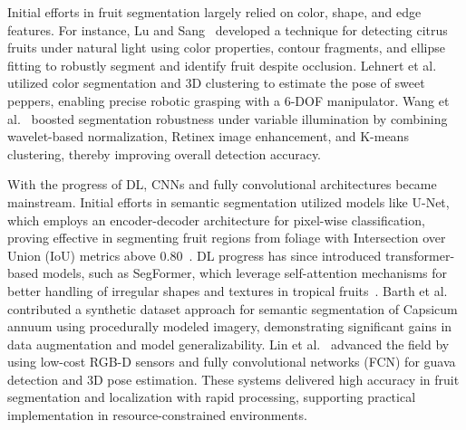 \documentclass[pdflatex,sn-mathphys-num]{sn-jnl}
\begin{document}
Initial efforts in fruit segmentation largely relied on color, shape, and edge features.
For instance, Lu and Sang~\cite{lu2015detecting} developed a technique for detecting citrus fruits under natural light using color properties, contour fragments, and ellipse fitting to robustly segment and identify fruit despite occlusion. 
Lehnert et al.~\cite{lehnert2016sweet} utilized color segmentation and 3D clustering to estimate the pose of sweet peppers, enabling precise robotic grasping with a 6-DOF manipulator. 
Wang et al.~\cite{wang2017robust} boosted segmentation robustness under variable illumination by combining wavelet-based normalization, Retinex image enhancement, and K-means clustering, thereby improving overall detection accuracy.

With the progress of DL, CNNs and fully convolutional architectures became mainstream. Initial efforts in semantic segmentation utilized models like U-Net, which employs an encoder-decoder architecture for pixel-wise classification, proving effective in segmenting fruit regions from foliage with Intersection over Union (IoU) metrics above 0.80~\cite{ronneberger2015u}. DL progress has since introduced transformer-based models, such as SegFormer, which leverage self-attention mechanisms for better handling of irregular shapes and textures in tropical fruits~\cite{xie2021segformer}. 
Barth et al.~\cite{barth2018data} contributed a synthetic dataset approach for semantic segmentation of Capsicum annuum using procedurally modeled imagery, demonstrating significant gains in data augmentation and model generalizability.
Lin et al.~\cite{lin2020color} advanced the field by using low-cost RGB-D sensors and fully convolutional networks (FCN) for guava detection and 3D pose estimation. These systems delivered high accuracy in fruit segmentation and localization with rapid processing, supporting practical implementation in resource-constrained environments.
\end{document}
